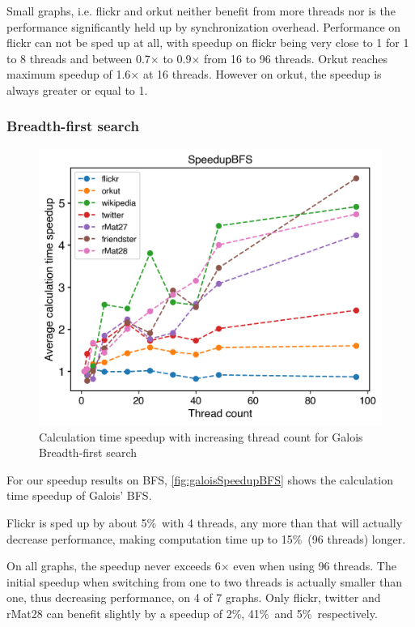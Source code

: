 Small graphs, i.e. flickr and orkut neither benefit from more threads nor is the performance significantly held up by synchronization overhead.
Performance on flickr can not be sped up at all, with speedup on flickr being very close to 1 for 1 to 8 threads and between 0.7$\times$ to 0.9$\times$ from 16 to 96 threads.
Orkut reaches maximum speedup of 1.6$\times$ at 16 threads. However on orkut, the speedup is always greater or equal to 1.



\subsubsection{Breadth-first search}
\begin{figure}
	\includegraphics[width=\linewidth]{../../plots/singleNodeBFSGaloisThreads.png}
	\caption{Calculation time speedup with increasing thread count for Galois Breadth-first search}
	\label{fig:galoisSpeedupBFS}
\end{figure}

For our speedup results on BFS, \autoref{fig:galoisSpeedupBFS} shows the calculation time speedup of Galois' BFS.

Flickr is sped up by about 5\%\ with 4 threads, any more than that will actually decrease performance, making computation time up to 15\%\ (96 threads) longer.

On all graphs, the speedup never exceeds 6$\times$ even when using 96 threads.
The initial speedup when switching from one to two threads is actually smaller than one, thus decreasing performance, on 4 of 7 graphs. Only flickr, twitter and rMat28 can benefit slightly by a speedup of 2\%, 41\%\ and 5\%\ respectively.

